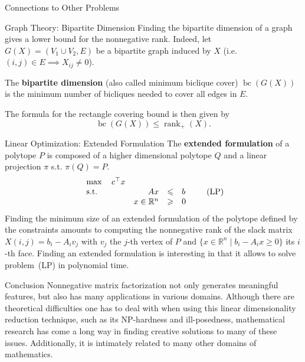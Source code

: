 \documentclass[final]{beamer}
\newlength{\onecolwid}
\newcommand{\real}{\mathbb{R}}
\DeclareMathOperator{\rank}{rank}
\begin{document}
\begin{frame}
\begin{columns}[t]
\begin{column}{\onecolwid}
\begin{exampleblock}{Connections to Other Problems}
\begin{block}{Graph Theory: Bipartite Dimension}
Finding the bipartite dimension of a graph gives a lower bound for the nonnegative rank. Indeed, let $G(X) = (V_1 \cup V_2, E)$ be a bipartite graph induced by \(X\) (i.e. $(i,j)\in E \implies X_{ij}\neq 0$). 
    
The \textbf{bipartite dimension} (also called minimum biclique cover) $\mathop{\mathrm{bc}}(G(X))$ is the minimum number of bicliques needed to cover all edges in \(E\).

The formula for the rectangle covering bound is then given by
\[
\mathop{\mathrm{bc}}(G(X)) \leqslant \rank_+(X).
\]
\end{block}

\begin{block}{Linear Optimization: Extended Formulation}
The \textbf{extended formulation} of a polytope \(P\) is composed of a higher dimensional polytope \(Q\) and a linear projection $\pi$ s.t. $\pi(Q) = P$.
\[
\begin{array}{l@{\quad}rcl}
\max \quad c^\top x&&& \\
\textnormal{s.t.} & Ax & \leqslant & b\\
& x \in \real^n & \geqslant & 0
\end{array}
\tag{\textnormal{LP}}
\]
Finding the minimum size of an extended formulation of the polytope defined by the constraints amounts to computing the nonnegative rank of the slack matrix $X(i,j) = b_i-A_iv_j$ with $v_j$ the $j$-th vertex of \(P\) and $\{x\in \real^n \mid b_i-A_ix\geqslant 0\}$ its $i$-th face.
Finding an extended formulation is interesting in that it allows to solve problem~(LP) in polynomial time.
\end{block}

\end{exampleblock}

\begin{alertblock}{Conclusion}
Nonnegative matrix factorization not only generates meaningful features, but also has many applications in various domains. Although there are theoretical difficulties one has to deal with when using this linear dimensionality reduction technique, such as its NP-hardness and ill-posedness, mathematical research has come a long way in finding creative solutions to many of these issues.
Additionally, it is intimately related to many other domains of mathematics.
\end{alertblock}


\end{column}
\end{columns}
\end{frame}
\end{document}

